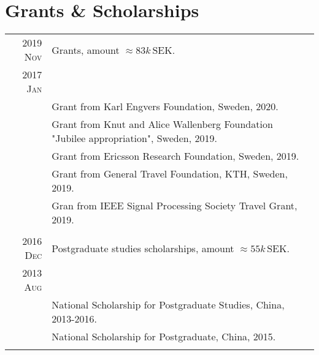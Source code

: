 \documentclass[a4paper,10pt]{article}
\begin{document}
\section{Grants \& Scholarships}
\begin{savenotes}
  \begin{longtable}{r|p{13cm}}
    \textsc{2019 Nov} & Grants, amount $\approx 83k\,\mathrm{SEK}$.\\
    \textsc{2017 Jan} & {} \\
                      & Grant from Karl Engvers Foundation, Sweden, 2020. \\

                      &  Grant from Knut and Alice Wallenberg Foundation
                        "Jubilee appropriation", Sweden, 2019. \\
                      & Grant from Ericsson Research Foundation, Sweden, 2019. \\
                      & Grant from General Travel Foundation, KTH, Sweden, 2019. \\
                      & Gran from IEEE Signal Processing Society Travel Grant, 2019. \\
    \multicolumn{2}{c}{} \\
    \textsc{2016 Dec} & Postgraduate studies scholarships, amount $\approx 55k\,\mathrm {SEK}$. \\
    \textsc{2013 Aug} & \\
      & National Scholarship for Postgraduate Studies, China, 2013-2016. \\
      & National Scholarship for Postgraduate, China, 2015.\\
    \multicolumn{2}{c}{} \\


\end{longtable}
\end{savenotes}
\end{document}
